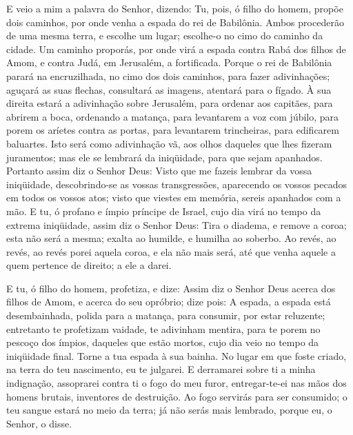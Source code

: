 E veio a mim a palavra do Senhor, dizendo: Tu, pois, ó
filho do homem, propõe dois caminhos, por onde venha a espada do rei
de Babilônia. Ambos procederão de uma mesma terra, e escolhe um
lugar; escolhe-o no cimo do caminho da cidade. Um caminho
proporás, por onde virá a espada contra Rabá dos filhos de Amom, e
contra Judá, em Jerusalém, a fortificada. Porque o rei de
Babilônia parará na encruzilhada, no cimo dos dois caminhos, para
fazer adivinhações; aguçará as suas flechas, consultará as imagens,
atentará para o fígado. À sua direita estará a adivinhação
sobre Jerusalém, para ordenar aos capitães, para abrirem a boca,
ordenando a matança, para levantarem a voz com júbilo, para porem os
aríetes contra as portas, para levantarem trincheiras, para
edificarem baluartes. Isto será como adivinhação vã, aos
olhos daqueles que lhes fizeram juramentos; mas ele se lembrará da
iniqüidade, para que sejam apanhados. Portanto assim diz o
Senhor Deus: Visto que me fazeis lembrar da vossa iniqüidade,
descobrindo-se as vossas transgressões, aparecendo os vossos pecados
em todos os vossos atos; visto que viestes em memória, sereis
apanhados com a mão. E tu, ó profano e ímpio príncipe de
Israel, cujo dia virá no tempo da extrema iniqüidade, assim
diz o Senhor Deus: Tira o diadema, e remove a coroa; esta não será a
mesma; exalta ao humilde, e humilha ao soberbo. Ao revés, ao
revés, ao revés porei aquela coroa, e ela não mais será, até que
venha aquele a quem pertence de direito; a ele a darei.

E tu, ó filho do homem, profetiza, e dize: Assim diz o Senhor
Deus acerca dos filhos de Amom, e acerca do seu opróbrio; dize pois:
A espada, a espada está desembainhada, polida para a matança, para
consumir, por estar reluzente; entretanto te profetizam
vaidade, te adivinham mentira, para te porem no pescoço dos ímpios,
daqueles que estão mortos, cujo dia veio no tempo da iniqüidade
final. Torne a tua espada à sua bainha. No lugar em que foste
criado, na terra do teu nascimento, eu te julgarei. E
derramarei sobre ti a minha indignação, assoprarei contra ti o fogo
do meu furor, entregar-te-ei nas mãos dos homens brutais, inventores
de destruição. Ao fogo servirás para ser consumido; o teu
sangue estará no meio da terra; já não serás mais lembrado, porque
eu, o Senhor, o disse.

\medskip

